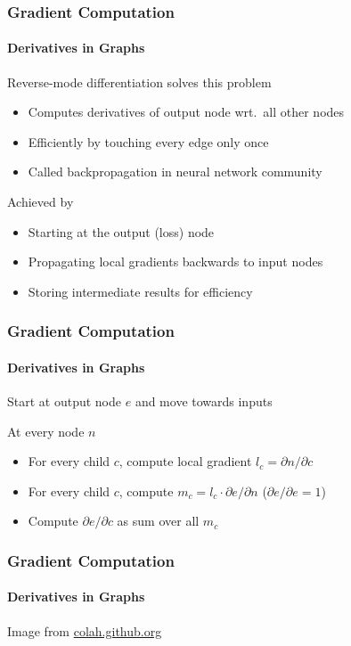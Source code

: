 \documentclass[xetex,professionalfont]{beamer}
\renewcommand\emph[1]{\textcolor{tuwcvl_cvl_blue}{#1}}
\begin{document}
\begin{frame}
\frametitle{Gradient Computation}
\framesubtitle{Derivatives in Graphs}

\emph{Reverse-mode differentiation} solves this problem
\begin{itemize}
    \item Computes derivatives of output node wrt.~all other nodes
    \item Efficiently by touching every edge only once
    \item Called \emph{backpropagation} in neural network community
\end{itemize}

\bigskip

Achieved by
\begin{itemize}
    \item Starting at the output (loss) node
    \item Propagating local gradients backwards to input nodes
    \item Storing intermediate results for efficiency
\end{itemize}


\end{frame}


\begin{frame}
\frametitle{Gradient Computation}
\framesubtitle{Derivatives in Graphs}

Start at output node $e$ and move towards inputs

\bigskip

At every node $n$
\begin{itemize}
    \item For every child $c$, compute local gradient $l_c=\partial n/\partial c$ %
    \item For every child $c$, compute $m_c=l_c\cdot\partial e/\partial n$ ($\partial e/\partial e=1$)
    \item Compute $\partial e/\partial c$ as sum over all $m_c$
\end{itemize}

\end{frame}


\begin{frame}
\frametitle{Gradient Computation}
\framesubtitle{Derivatives in Graphs}


\begin{center}
    {\centering Image from \href{https://colah.github.io/posts/2015-08-Backprop/}{colah.github.org}}
\end{center}

\end{frame}
\end{document}
